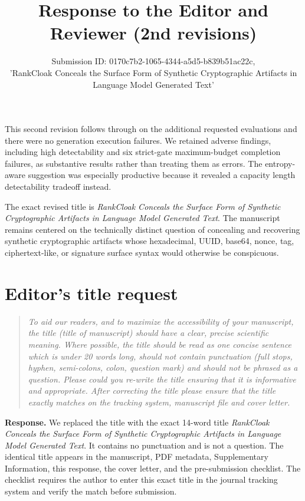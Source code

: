 \documentclass[11pt]{article}
\title{Response to the Editor and Reviewer (2nd revisions)}
\author{Submission ID: 0170c7b2-1065-4344-a5d5-b839b51ac22c, \\'RankCloak Conceals the Surface Form of Synthetic Cryptographic Artifacts in\\ Language Model Generated Text'}
\date{}
\newenvironment{reviewcomment}{\begin{quote}\color{commentgray}\itshape}{\end{quote}}
\begin{document}
\maketitle
\begin{center}

  
\end{center}

This second revision follows through on the additional requested evaluations and there were no generation execution failures. We retained adverse findings, including high detectability and six strict-gate maximum-budget completion failures, as substantive results rather than treating them as errors. The entropy-aware suggestion was especially productive because it revealed a capacity length detectability tradeoff instead.

The exact revised title is \emph{RankCloak Conceals the Surface Form of Synthetic Cryptographic Artifacts in Language Model Generated Text}. The manuscript remains centered on the technically distinct question of concealing and recovering synthetic cryptographic artifacts whose hexadecimal, UUID, base64, nonce, tag, ciphertext-like, or signature surface syntax would otherwise be conspicuous.


\section*{Editor's title request}

\begin{reviewcomment}
To aid our readers, and to maximize the accessibility of your manuscript, the title (title of manuscript) should have a clear, precise scientific meaning. Where possible, the title should be read as one concise sentence which is under 20 words long, should not contain punctuation (full stops, hyphen, semi-colons, colon, question mark) and should not be phrased as a question. Please could you re-write the title ensuring that it is informative and appropriate. After correcting the title please ensure that the title exactly matches on the tracking system, manuscript file and cover letter.
\end{reviewcomment}

\noindent\textbf{Response.}
We replaced the title with the exact 14-word title \emph{RankCloak Conceals the Surface Form of Synthetic Cryptographic Artifacts in Language Model Generated Text}. It contains no punctuation and is not a question. The identical title appears in the manuscript, PDF metadata, Supplementary Information, this response, the cover letter, and the pre-submission checklist. The checklist requires the author to enter this exact title in the journal tracking system and verify the match before submission.
\end{document}
